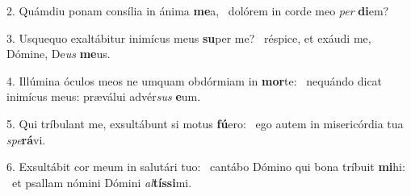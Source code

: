 2. Quámdiu ponam consília in ánima \textbf{me}a, \ast\  dolórem in corde meo \textit{per} \textbf{di}em?\

3. Usquequo exaltábitur inimícus meus \textbf{su}per me? \ast\  réspice, et exáudi me, Dómine, De\textit{us} \textbf{me}us.\

4. Illúmina óculos meos ne umquam obdórmiam in \textbf{mor}te: \ast\  nequándo dicat inimícus meus: præválui advér\textit{sus} \textbf{e}um.\

5. Qui tríbulant me, exsultábunt si motus \textbf{fú}ero: \ast\  ego autem in misericórdia tua \textit{spe}\textbf{rá}vi.\

6. Exsultábit cor meum in salutári tuo: \dag\  cantábo Dómino qui bona tríbuit \textbf{mi}hi: \ast\  et psallam nómini Dómini \textit{al}\textbf{tís}\textbf{si}mi.\

